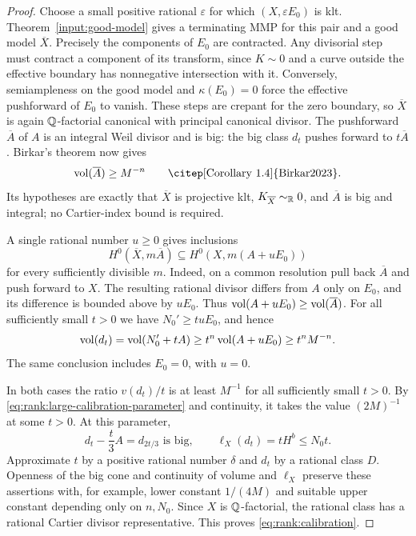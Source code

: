 \begin{proof}
Choose a small positive rational $\varepsilon$ for which
$(X,\varepsilon E_0)$ is klt.  Theorem~\ref{input:good-model}
gives a terminating MMP for this pair and a
good model $\overline X$.  Precisely the components of $E_0$ are
contracted.  Any divisorial step must contract a component of its
transform, since $K\sim0$ and a curve outside the effective boundary
has nonnegative intersection with it.  Conversely, semiampleness on
the good model and $\kappa(E_0)=0$ force the effective pushforward
of $E_0$ to vanish.  These steps are crepant for the zero boundary, so
$\overline X$ is again $\mathbb Q$-factorial canonical with principal
canonical divisor.  The pushforward $\overline A$ of $A$ is an
integral Weil divisor and is big: the big class $d_t$ pushes forward
to $t\overline A$.  Birkar's theorem now gives
\begin{equation}\label{eq:rank:integral-volume-lower-bound}
 \vol(\overline A)\ge M^{-n}
 \qquad\text{\citep[Corollary~1.4]{Birkar2023}}.
\end{equation}
Its hypotheses are exactly that $\overline X$ is projective klt,
$K_{\overline X}\sim_{\mathbb R}0$, and $\overline A$ is big and integral;
no Cartier-index bound is required.

A single rational number $u\ge0$ gives inclusions
\[
 H^0(\overline X,m\overline A)
 \subseteq H^0(X,m(A+uE_0))
\]
for every sufficiently divisible $m$.  Indeed, on a common resolution
pull back $\overline A$ and push forward to $X$.  The resulting
rational divisor differs from $A$ only on $E_0$, and its difference
is bounded above by $uE_0$.  Thus
$\operatorname{vol}(A+uE_0)\ge\operatorname{vol}(\overline A)$.
For all sufficiently small $t>0$ we have $N_0'\ge tuE_0$, and hence
\[
 \operatorname{vol}(d_t)=\operatorname{vol}(N_0'+tA)
 \ge t^n\operatorname{vol}(A+uE_0)\ge t^n M^{-n}.
\]
The same conclusion includes $E_0=0$, with $u=0$.

In both cases the ratio $v(d_t)/t$ is at least $M^{-1}$ for all
sufficiently small $t>0$.  By
\eqref{eq:rank:large-calibration-parameter} and continuity, it takes
the value $(2M)^{-1}$ at some $t>0$.  At this parameter,
\[
 d_t-\frac t3A=d_{2t/3}\text{ is big},
 \qquad \ell_X(d_t)=tH^b\le N_0t.
\]
Approximate $t$ by a positive rational number $\delta$ and $d_t$ by a
rational class $D$.  Openness of the big cone and continuity of volume
and $\ell_X$ preserve these assertions with, for example, lower
constant $1/(4M)$ and suitable upper constant depending only on
$n,N_0$.  Since $X$ is $\mathbb Q$-factorial, the rational class has a
rational Cartier divisor representative.  This proves
\eqref{eq:rank:calibration}.
\end{proof}

